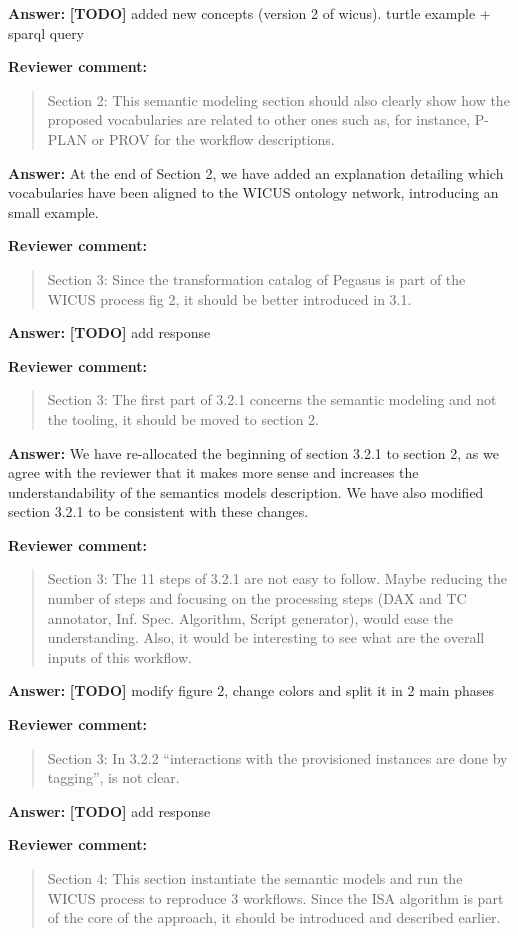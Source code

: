 \documentclass{letter}
\newenvironment{review}%
{\textbf{Reviewer comment:}\begin{quote}}%
{\end{quote}}%
\newcommand{\todo}[1]{%
      \color{red}\textbf{[TODO]} #1\color{black}}
\newcommand{\answer}[1]{%
      \textbf{Answer:} #1}
\begin{document}
\begin{letter}{}
\answer{\todo{added new concepts (version 2 of wicus). turtle example + sparql query}}


\begin{review}
Section 2: This semantic modeling section should also clearly show how the proposed vocabularies are related to other ones such as, for instance, P-PLAN or PROV for the workflow descriptions.
\end{review}

\answer{At the end of Section 2, we have added an explanation detailing which vocabularies have been aligned to the WICUS ontology network, introducing an small example.}


\begin{review}
Section 3: Since the transformation catalog of Pegasus is part of the WICUS process fig 2, it should be better introduced in 3.1.
\end{review}

\answer{\todo{add response}}


\begin{review}
Section 3: The first part of 3.2.1 concerns the semantic modeling and not the tooling, it should be moved to section 2.
\end{review}

\answer{We have re-allocated the beginning of section 3.2.1 to section 2, as we agree with the reviewer that it makes  more sense and increases the understandability of the semantics models description. We have also modified section 3.2.1 to be consistent with these changes.}


\begin{review}
Section 3: The 11 steps of 3.2.1 are not easy to follow. Maybe reducing the number of steps and focusing on the processing steps (DAX and TC annotator, Inf. Spec. Algorithm, Script generator), would ease the understanding. Also, it would be interesting to see what are the overall inputs of this workflow.
\end{review}

\answer{\todo{modify figure 2, change colors and split it in 2 main phases}}


\begin{review}
Section 3: In 3.2.2 ``interactions with the provisioned instances are done by tagging'', is not clear.
\end{review}

\answer{\todo{add response}}


\begin{review}
Section 4: This section instantiate the semantic models and run the WICUS process to reproduce 3 workflows. Since the ISA algorithm is part of the core of the approach, it should be introduced and described earlier.
\end{review}


\end{letter}
\end{document}
